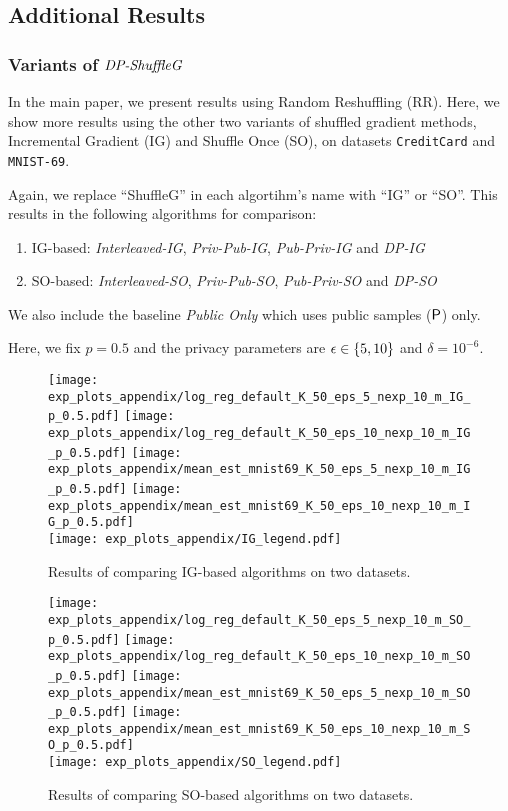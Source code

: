 \subsection{Additional Results}
\label{subsec:appendix_more_results}


\subsubsection{Variants of $\textit{DP-ShuffleG}$}
\label{subsec:appendix_var_dpsg}

In the main paper, we present results using Random Reshuffling (RR). Here, we show more results using the other two variants of shuffled gradient methods, Incremental Gradient (IG) and Shuffle Once (SO), on datasets \texttt{CreditCard} and \texttt{MNIST-69}.

Again, we replace ``ShuffleG'' in each algortihm's name with ``IG'' or ``SO''. This results in the following algorithms for comparison:
\begin{enumerate}
    \item IG-based: \textit{Interleaved-IG}, \textit{Priv-Pub-IG}, \textit{Pub-Priv-IG} and \textit{DP-IG}
    \item SO-based: \textit{Interleaved-SO}, \textit{Priv-Pub-SO}, \textit{Pub-Priv-SO} and \textit{DP-SO}
\end{enumerate}
We also include the baseline \textit{Public Only} which uses public samples (${\mathsf{P}}$) only. 

Here, we fix $p=0.5$ and the privacy parameters are ${\epsilon}\in \{5, 10\}$ and $\delta = 10^{-6}$.

\begin{figure}[H]
    \centering
    \texttt{[image: exp\_plots\_appendix/log\_reg\_default\_K\_50\_eps\_5\_nexp\_10\_m\_IG\_p\_0.5.pdf]}
    \texttt{[image: exp\_plots\_appendix/log\_reg\_default\_K\_50\_eps\_10\_nexp\_10\_m\_IG\_p\_0.5.pdf]}
    \texttt{[image: exp\_plots\_appendix/mean\_est\_mnist69\_K\_50\_eps\_5\_nexp\_10\_m\_IG\_p\_0.5.pdf]}
    \texttt{[image: exp\_plots\_appendix/mean\_est\_mnist69\_K\_50\_eps\_10\_nexp\_10\_m\_IG\_p\_0.5.pdf]}\\
    \texttt{[image: exp\_plots\_appendix/IG\_legend.pdf]}
    \caption{Results of comparing IG-based algorithms on two datasets.}
    \label{fig:appendix_IG}
\end{figure}

\begin{figure}[H]
    \centering
    \texttt{[image: exp\_plots\_appendix/log\_reg\_default\_K\_50\_eps\_5\_nexp\_10\_m\_SO\_p\_0.5.pdf]}
    \texttt{[image: exp\_plots\_appendix/log\_reg\_default\_K\_50\_eps\_10\_nexp\_10\_m\_SO\_p\_0.5.pdf]}
    \texttt{[image: exp\_plots\_appendix/mean\_est\_mnist69\_K\_50\_eps\_5\_nexp\_10\_m\_SO\_p\_0.5.pdf]}
    \texttt{[image: exp\_plots\_appendix/mean\_est\_mnist69\_K\_50\_eps\_10\_nexp\_10\_m\_SO\_p\_0.5.pdf]}\\
    \texttt{[image: exp\_plots\_appendix/SO\_legend.pdf]}
    \caption{Results of comparing SO-based algorithms on two datasets.}
    \label{fig:appendix_SO}
\end{figure}




